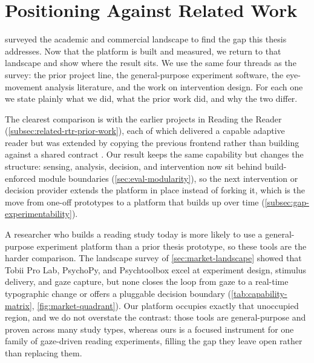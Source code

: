 \section{Positioning Against Related Work}
\label{sec:disc-related-work}

 surveyed the academic and commercial landscape to find the gap this thesis addresses.
Now that the platform is built and measured, we return to that landscape and show where the result sits.
We use the same four threads as the survey: the prior project line, the general-purpose experiment software, the eye-movement analysis literature, and the work on intervention design.
For each one we state plainly what we did, what the prior work did, and why the two differ.

The clearest comparison is with the earlier projects in Reading the Reader (\cref{subsec:related-rtr-prior-work}), each of which delivered a capable adaptive reader but was extended by copying the previous frontend rather than building against a shared contract \cite{refsgaard2024rtr, pereira2024typography, palinec2024reactive}.
Our result keeps the same capability but changes the structure: sensing, analysis, decision, and intervention now sit behind build-enforced module boundaries (\cref{sec:eval-modularity}), so the next intervention or decision provider extends the platform in place instead of forking it, which is the move from one-off prototypes to a platform that builds up over time (\cref{subsec:gap-experimentability}).

A researcher who builds a reading study today is more likely to use a general-purpose experiment platform than a prior thesis prototype, so these tools are the harder comparison.
The landscape survey of \cref{sec:market-landscape} showed that Tobii Pro Lab, PsychoPy, and Psychtoolbox excel at experiment design, stimulus delivery, and gaze capture, but none closes the loop from gaze to a real-time typographic change or offers a pluggable decision boundary (\cref{tab:capability-matrix}, \cref{fig:market-quadrant}).
Our platform occupies exactly that unoccupied region, and we do not overstate the contrast: those tools are general-purpose and proven across many study types, whereas ours is a focused instrument for one family of gaze-driven reading experiments, filling the gap they leave open rather than replacing them.

